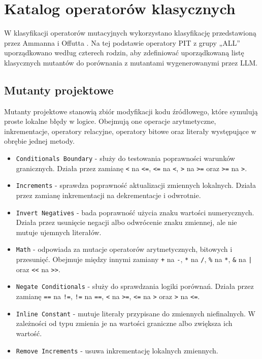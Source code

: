 \documentclass[12pt,a4paper,oldfontcommands]{memoir}
\theoremstyle{plain}
\theoremstyle{definition}
\theoremstyle{remark}
\begin{document}
    \section{Katalog operatorów klasycznych}

    W klasyfikacji operatorów mutacyjnych wykorzystano klasyfikację przedstawioną przez Ammanna i Offutta \cite{ref4}.
    Na tej podstawie operatory PIT z grupy „ALL” uporządkowano według czterech rodzin, aby zdefiniować uporządkowaną listę klasycznych mutantów do porównania z mutantami wygenerowanymi przez LLM.

    \subsection{Mutanty projektowe}

    Mutanty projektowe stanowią zbiór modyfikacji kodu źródłowego, które symulują proste lokalne błędy w logice.
    Obejmują one operacje arytmetyczne, inkrementacje, operatory relacyjne, operatory bitowe oraz literały występujące w obrębie jednej metody.

    \begin{itemize}
        \item \texttt{Conditionals Boundary} - służy do testowania poprawności warunków granicznych. Działa przez zamianę \texttt{\textless} na \texttt{\textless=}, \texttt{\textless=} na \texttt{\textless}, \texttt{\textgreater} na \texttt{\textgreater=} oraz \texttt{\textgreater=} na \texttt{\textgreater}.
        \item \texttt{Increments} - sprawdza poprawność aktualizacji zmiennych lokalnych. Działa przez zamianę inkrementacji na dekrementacje i odwrotnie.
        \item \texttt{Invert Negatives} - bada poprawność użycia znaku wartości numerycznych. Działa przez usunięcie negacji albo odwrócenie znaku zmiennej, ale nie mutuje ujemnych literałów.
        \item \texttt{Math} - odpowiada za mutacje operatorów arytmetycznych, bitowych i przesunięć. Obejmuje między innymi zamiany \texttt{+} na \texttt{-}, \texttt{*} na \texttt{/}, \texttt{\%} na \texttt{*}, \texttt{\&} na \texttt{|} oraz \texttt{\textless\textless} na \texttt{\textgreater\textgreater}.
        \item \texttt{Negate Conditionals} - służy do sprawdzania logiki porównań. Działa przez zamianę \texttt{==} na \texttt{!=}, \texttt{!=} na \texttt{==}, \texttt{\textless} na \texttt{\textgreater=}, \texttt{\textless=} na \texttt{\textgreater} oraz \texttt{\textgreater} na \texttt{\textless=}.
        \item \texttt{Inline Constant} - mutuje literały przypisane do zmiennych niefinalnych. W zależności od typu zmienia je na wartości graniczne albo zwiększa ich wartość.
        \item \texttt{Remove Increments} - usuwa inkrementację lokalnych zmiennych.
    \end{itemize}
\end{document}
